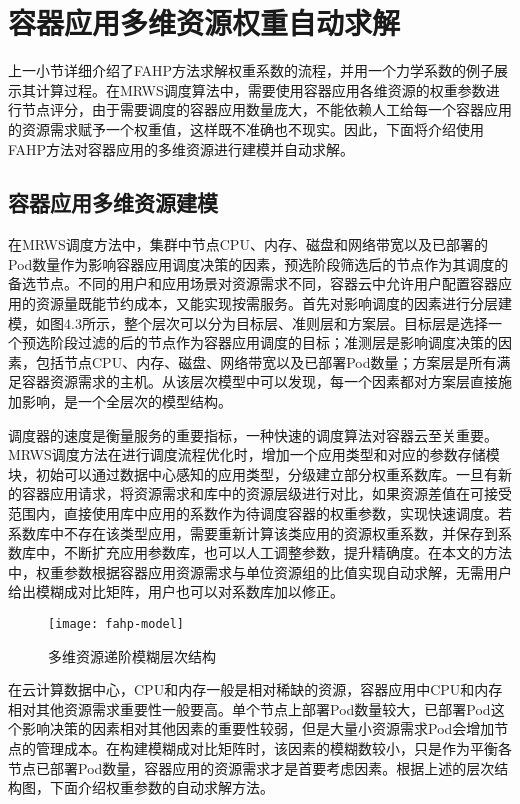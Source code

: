 \section{容器应用多维资源权重自动求解}
上一小节详细介绍了FAHP方法求解权重系数的流程，并用一个力学系数的例子展示其计算过程。在MRWS调度算法中，需要使用容器应用各维资源的权重参数进行节点评分，由于需要调度的容器应用数量庞大，不能依赖人工给每一个容器应用的资源需求赋予一个权重值，这样既不准确也不现实。因此，下面将介绍使用FAHP方法对容器应用的多维资源进行建模并自动求解。
\subsection{容器应用多维资源建模}
在MRWS调度方法中，集群中节点CPU、内存、磁盘和网络带宽以及已部署的Pod数量作为影响容器应用调度决策的因素，预选阶段筛选后的节点作为其调度的备选节点。不同的用户和应用场景对资源需求不同，容器云中允许用户配置容器应用的资源量既能节约成本，又能实现按需服务。首先对影响调度的因素进行分层建模，如图4.3所示，整个层次可以分为目标层、准则层和方案层。目标层是选择一个预选阶段过滤的后的节点作为容器应用调度的目标；准测层是影响调度决策的因素，包括节点CPU、内存、磁盘、网络带宽以及已部署Pod数量；方案层是所有满足容器资源需求的主机。从该层次模型中可以发现，每一个因素都对方案层直接施加影响，是一个全层次的模型结构。

调度器的速度是衡量服务的重要指标，一种快速的调度算法对容器云至关重要。MRWS调度方法在进行调度流程优化时，增加一个应用类型和对应的参数存储模块，初始可以通过数据中心感知的应用类型，分级建立部分权重系数库。一旦有新的容器应用请求，将资源需求和库中的资源层级进行对比，如果资源差值在可接受范围内，直接使用库中应用的系数作为待调度容器的权重参数，实现快速调度。若系数库中不存在该类型应用，需要重新计算该类应用的资源权重系数，并保存到系数库中，不断扩充应用参数库，也可以人工调整参数，提升精确度。在本文的方法中，权重参数根据容器应用资源需求与单位资源组的比值实现自动求解，无需用户给出模糊成对比矩阵，用户也可以对系数库加以修正。
\begin{figure}[H] %
	\centering
	\texttt{[image: fahp-model]}
	\caption{多维资源递阶模糊层次结构}
\end{figure}
在云计算数据中心，CPU和内存一般是相对稀缺的资源，容器应用中CPU和内存相对其他资源需求重要性一般要高。单个节点上部署Pod数量较大，已部署Pod这个影响决策的因素相对其他因素的重要性较弱，但是大量小资源需求Pod会增加节点的管理成本。在构建模糊成对比矩阵时，该因素的模糊数较小，只是作为平衡各节点已部署Pod数量，容器应用的资源需求才是首要考虑因素。根据上述的层次结构图，下面介绍权重参数的自动求解方法。

